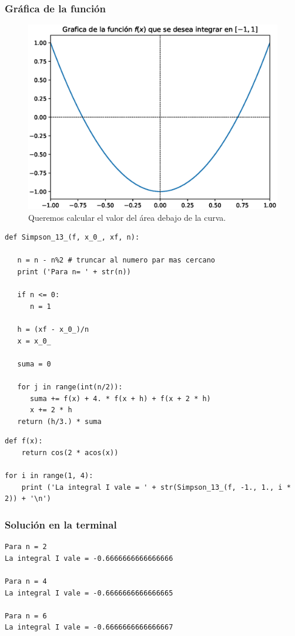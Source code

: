 \begin{frame}
\frametitle{Gráfica de la función}
\begin{figure}
    \centering
    \includegraphics[scale=0.5]{Imagenes/integral_1_3_simpson.eps}
    \caption{Queremos calcular el valor del área debajo de la curva.}
\end{figure}
\end{frame}
\begin{frame}
\begin{lstlisting}[caption=Propuesta de código, style=FormattedNumber, basicstyle=\linespread{1.1}\ttfamily=\small, columns=fullflexible]
def Simpson_13_(f, x_0_, xf, n):
   
   n = n - n%2 # truncar al numero par mas cercano
   print ('Para n= ' + str(n))
   
   if n <= 0:
      n = 1
   
   h = (xf - x_0_)/n
   x = x_0_
   
   suma = 0
   
   for j in range(int(n/2)):
      suma += f(x) + 4. * f(x + h) + f(x + 2 * h)
      x += 2 * h
   return (h/3.) * suma
\end{lstlisting}
\end{frame}
\begin{frame}
\begin{lstlisting}[caption=Solución al problema, style=FormattedNumber, basicstyle=\linespread{1.1}\ttfamily=\small, columns=fullflexible]
def f(x):
    return cos(2 * acos(x))

for i in range(1, 4):
    print ('La integral I vale = ' + str(Simpson_13_(f, -1., 1., i * 2)) + '\n')
\end{lstlisting}
\end{frame}
\begin{frame}[fragile]
\frametitle{Solución en la terminal}
\begin{verbatim}
Para n = 2
La integral I vale = -0.6666666666666666

Para n = 4
La integral I vale = -0.6666666666666665

Para n = 6
La integral I vale = -0.6666666666666667 
\end{verbatim}
\end{frame}
